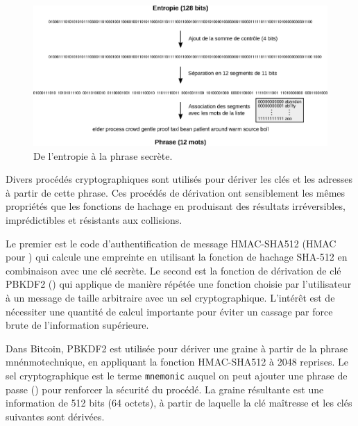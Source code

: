 \begin{figure}[h]
  \centering
  \includegraphics[scale=0.6]{img/from-entropy-to-mnemonic.eps}
  \caption{De l'entropie à la phrase secrète.}
  \label{fig:from-entropy-to-mnemonic}
\end{figure}


Divers procédés cryptographiques sont utilisés pour dériver les clés et les adresses à partir de cette phrase. Ces procédés de dérivation ont sensiblement les mêmes propriétés que les fonctions de hachage en produisant des résultats irréversibles, imprédictibles et résistants aux collisions.

Le premier est le code d'authentification de message HMAC-SHA512 (HMAC pour ) qui calcule une empreinte en utilisant la fonction de hachage SHA-512 en combinaison avec une clé secrète. Le second est la fonction de dérivation de clé PBKDF2 () qui applique de manière répétée une fonction choisie par l'utilisateur à un message de taille arbitraire avec un sel cryptographique.  L'intérêt est de nécessiter une quantité de calcul importante pour éviter un cassage par force brute de l'information supérieure.

Dans Bitcoin, PBKDF2 est utilisée pour dériver une graine à partir de la phrase mnénmotechnique, en appliquant la fonction HMAC-SHA512 à 2048 reprises. Le sel cryptographique est le terme \texttt{mnemonic} auquel on peut ajouter une phrase de passe () pour renforcer la sécurité du procédé. La graine résultante est une information de 512 bits (64 octets), à partir de laquelle la clé maîtresse et les clés suivantes sont dérivées.

